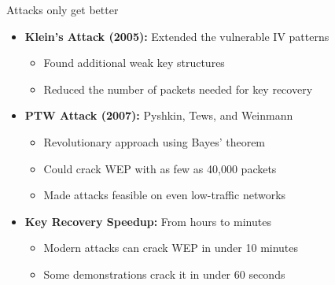 \documentclass[aspectratio=169, lualatex, handout]{beamer}
\begin{document}
\begin{frame}{Attacks only get better}
	\begin{itemize}
		\item \textbf{Klein's Attack (2005):} Extended the vulnerable IV patterns
		      \begin{itemize}
			      \item Found additional weak key structures
			      \item Reduced the number of packets needed for key recovery
		      \end{itemize}
		\item \textbf{PTW Attack (2007):} Pyshkin, Tews, and Weinmann
		      \begin{itemize}
			      \item Revolutionary approach using Bayes' theorem
			      \item Could crack WEP with as few as 40,000 packets
			      \item Made attacks feasible on even low-traffic networks
		      \end{itemize}
		\item \textbf{Key Recovery Speedup:} From hours to minutes
		      \begin{itemize}
			      \item Modern attacks can crack WEP in under 10 minutes
			      \item Some demonstrations crack it in under 60 seconds
		      \end{itemize}
	\end{itemize}
\end{frame}
\end{document}
